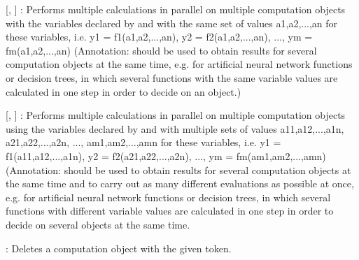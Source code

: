 \begin{DoxyItemize}
\item {} \mbox{[}, \mbox{]} \+: Performs multiple calculations in parallel on multiple computation objects with the variables declared by  and with the same set of values a1,a2,...,an for these variables, i.\+e. y1 = f1(a1,a2,...,an), y2 = f2(a1,a2,...,an), ..., ym = fm(a1,a2,...,an) (Annotation\+:  should be used to obtain results for several computation objects at the same time, e.\+g. for artificial neural network functions or decision trees, in which several functions with the same variable values are calculated in one step in order to decide on an object.)
\item {} \mbox{[}, \mbox{]} \+: Performs multiple calculations in parallel on multiple computation objects using the variables declared by  and with multiple sets of values a11,a12,...,a1n, a21,a22,...,a2n, ..., am1,am2,...,amn for these variables, i.\+e. y1 = f1(a11,a12,...,a1n), y2 = f2(a21,a22,...,a2n), ..., ym = fm(am1,am2,...,amn) (Annotation\+:  should be used to obtain results for several computation objects at the same time and to carry out as many different evaluations as possible at once, e.\+g. for artificial neural network functions or decision trees, in which several functions with different variable values are calculated in one step in order to decide on several objects at the same time.
\item {} \+: Deletes a computation object with the given token. 
\end{DoxyItemize}